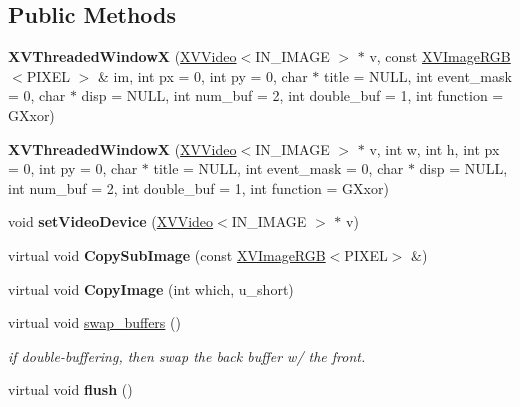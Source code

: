 \subsection*{Public Methods}
\begin{CompactItemize}
\item 
{\bf XVThreaded\-Window\-X} (\hyperlink{class_XVVideo}{XVVideo}$<$IN\_\-IMAGE $>$ $\ast$ v, const \hyperlink{class_XVImageRGB}{XVImage\-RGB}$<$PIXEL $>$ \& im, int px = 0, int py = 0, char $\ast$ title = NULL, int event\_\-mask = 0, char $\ast$ disp = NULL, int num\_\-buf = 2, int double\_\-buf = 1, int function = GXxor)
\item 
{\bf XVThreaded\-Window\-X} (\hyperlink{class_XVVideo}{XVVideo}$<$IN\_\-IMAGE $>$ $\ast$ v, int w, int h, int px = 0, int py = 0, char $\ast$ title = NULL, int event\_\-mask = 0, char $\ast$ disp = NULL, int num\_\-buf = 2, int double\_\-buf = 1, int function = GXxor)
\item 
void {\bf set\-Video\-Device} (\hyperlink{class_XVVideo}{XVVideo}$<$IN\_\-IMAGE $>$ $\ast$ v)
\item 
\label{XVThreadedWindowX_a3}
\hypertarget{class_XVThreadedWindowX_a3}{
virtual void {\bf Copy\-Sub\-Image} (const \hyperlink{class_XVImageRGB}{XVImage\-RGB}$<$PIXEL$>$ \&)}

\item 
\label{XVThreadedWindowX_a4}
\hypertarget{class_XVThreadedWindowX_a4}{
virtual void {\bf Copy\-Image} (int which, u\_\-short)}

\item 
\label{XVThreadedWindowX_a5}
\hypertarget{class_XVThreadedWindowX_a5}{
virtual void \hyperlink{class_XVThreadedWindowX_a5}{swap\_\-buffers} ()}

\begin{CompactList}\small\item\em if double-buffering, then swap the back buffer w/ the front.\item\end{CompactList}\item 
\label{XVThreadedWindowX_a6}
\hypertarget{class_XVThreadedWindowX_a6}{
virtual void {\bf flush} ()}


\end{CompactItemize}
